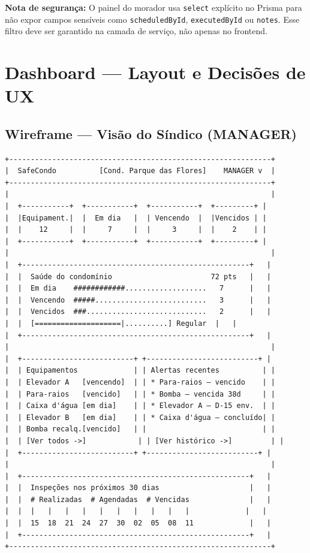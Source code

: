 \documentclass[12pt, a4paper]{article}
\begin{document}
\textbf{Nota de segurança:} O painel do morador usa \texttt{select} explícito no Prisma
para não expor campos sensíveis como \texttt{scheduledById}, \texttt{executedById} ou
\texttt{notes}. Esse filtro deve ser garantido na camada de serviço, não apenas no frontend.

\vspace{0.5cm}

\section{Dashboard — Layout e Decisões de UX}
\label{sec:dashboard}

\subsection{Wireframe — Visão do Síndico (MANAGER)}

\begin{verbatim}
+-------------------------------------------------------------+
|  SafeCondo          [Cond. Parque das Flores]    MANAGER v  |
+-------------------------------------------------------------+
|                                                             |
|  +-----------+  +-----------+  +-----------+  +---------+ |
|  |Equipament.|  |  Em dia   |  | Vencendo  |  |Vencidos | |
|  |    12     |  |     7     |  |     3     |  |    2    | |
|  +-----------+  +-----------+  +-----------+  +---------+ |
|                                                             |
|  +-----------------------------------------------------+   |
|  |  Saúde do condomínio                       72 pts   |   |
|  |  Em dia    ############...................   7      |   |
|  |  Vencendo  #####..........................   3      |   |
|  |  Vencidos  ###............................   2      |   |
|  |  [====================|..........] Regular  |   |
|  +-----------------------------------------------------+   |
|                                                             |
|  +--------------------------+ +--------------------------+ |
|  | Equipamentos             | | Alertas recentes          | |
|  | Elevador A   [vencendo]  | | * Para-raios — vencido    | |
|  | Para-raios   [vencido]   | | * Bomba — vencida 38d     | |
|  | Caixa d'água [em dia]    | | * Elevador A — D-15 env.  | |
|  | Elevador B   [em dia]    | | * Caixa d'água — concluído| |
|  | Bomba recalq.[vencido]   | |                           | |
|  | [Ver todos ->]            | | [Ver histórico ->]         | |
|  +--------------------------+ +--------------------------+ |
|                                                             |
|  +-----------------------------------------------------+   |
|  |  Inspeções nos próximos 30 dias                     |   |
|  |  # Realizadas  # Agendadas  # Vencidas              |   |
|  |  |   |   |   |   |   |   |   |   |   |             |   |
|  |  15  18  21  24  27  30  02  05  08  11             |   |
|  +-----------------------------------------------------+   |
+-------------------------------------------------------------+
\end{verbatim}
\end{document}
